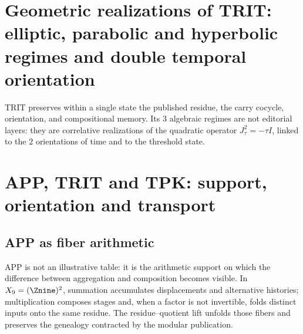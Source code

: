 \label{chap:83-02}

\section{Geometric realizations of TRIT: elliptic, parabolic and hyperbolic regimes and double temporal orientation}

TRIT preserves within a single state the published residue, the carry
cocycle, orientation, and compositional memory. Its \(3\) algebraic
regimes are not editorial layers: they are correlative realizations of the
quadratic operator \(J_{\tau}^{2}=-\tau I\), linked to the \(2\)
orientations of time and to the threshold state.

\begin{HMTScientificOwnerSubordinated}
\def\HMTTRITFormal{1}
\def\HMTTRITDevelopments{1}

\let\HMTTRITFormal\undefined
\let\HMTTRITDevelopments\undefined
\end{HMTScientificOwnerSubordinated}

\begin{HMTScientificOwnerSubordinated}

\end{HMTScientificOwnerSubordinated}

\begin{HMTScientificOwnerSubordinated}

\end{HMTScientificOwnerSubordinated}

\section[APP, TRIT and TPK: support, orientation and transport]
{APP, TRIT and TPK: support, orientation and transport}

\subsection{APP as fiber arithmetic}

APP is not an illustrative table: it is the arithmetic support on which the
difference between aggregation and composition becomes visible. In
\(
X_9=(\Znine)^2
\),
summation accumulates displacements and alternative histories; multiplication composes
stages and, when a factor is not invertible, folds distinct inputs onto
the same residue. The residue--quotient lift unfolds those fibers and
preserves the genealogy contracted by the modular publication.

